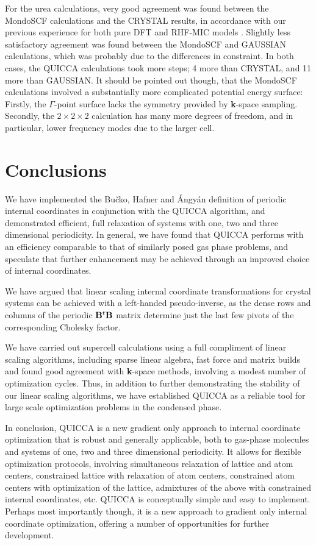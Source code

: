 \twolinestyle{\documentclass[prb,preprint]{revtex4}}
\begin{document}
For the urea calculations, very good agreement was found between the 
{\sc MondoSCF} calculations and the {\sc CRYSTAL} results, in accordance 
with our previous experience for both pure DFT \cite{CTymczak05a} and RHF-MIC models \cite{CTymczak05b}.  
Slightly less satisfactory agreement was found between the {\sc MondoSCF} and 
{\sc GAUSSIAN} calculations, which was probably due to the differences in 
constraint.  In both cases, the QUICCA calculations took more steps; 
4 more than {\sc CRYSTAL}, and 11 more than {\sc GAUSSIAN}.  It should
be pointed out though, that the {\sc MondoSCF} calculations involved 
a substantially more complicated potential energy surface:  Firstly, 
the $\Gamma$-point surface lacks the symmetry provided by {\bf k}-space
sampling.  Secondly, the $2\times2\times2$ calculation has many more 
degrees of freedom, and in particular, lower frequency modes due to the 
larger cell.  
  
\section{Conclusions} \label{conclusion}

We have implemented the Bu\v{c}ko, Hafner and {\'A}ngy{\'a}n  \cite{TBucko05}
definition of periodic internal coordinates in conjunction with the QUICCA
algorithm, and demonstrated efficient, full relaxation of systems with 
one, two and three dimensional periodicity.  In general, we have found that
QUICCA performs with an efficiency comparable to that of similarly posed gas 
phase problems, and speculate that further enhancement  may be achieved through
an improved choice of internal coordinates.

We have argued that linear scaling internal coordinate transformations for 
crystal systems can be achieved with a left-handed pseudo-inverse, as the 
dense rows and columns of the periodic ${\bf B}^t {\bf B}$ matrix determine
just the last few pivots of the corresponding Cholesky factor.

We have carried out supercell calculations using a full compliment of
linear scaling algorithms, including sparse linear algebra, fast force and 
matrix builds and found good agreement with {\bf k}-space methods, involving 
a modest number of optimization cycles.  Thus, in addition to further demonstrating 
the stability of our linear scaling algorithms, we have established QUICCA as a 
reliable tool for large scale optimization problems in the condensed phase.

In conclusion, QUICCA is a new gradient only approach to internal coordinate
optimization that is robust and generally applicable, both to gas-phase
molecules and systems of one, two and three dimensional periodicity.  It 
allows for flexible optimization protocols, involving simultaneous 
relaxation of lattice and atom centers, constrained lattice with relaxation of 
atom centers, constrained atom centers with optimization of the lattice,
admixtures of the above with constrained internal coordinates, etc. 
QUICCA is conceptually simple and easy to implement.
Perhaps most importantly though, it is a new approach to gradient only 
internal coordinate optimization, offering a number of opportunities for 
further development.
\end{document}
